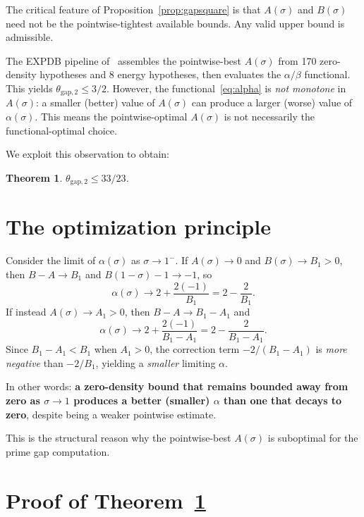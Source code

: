 \documentclass[11pt,a4paper]{amsart}
\theoremstyle{plain}
\newtheorem{theorem}{Theorem}
\theoremstyle{definition}
\begin{document}
The critical feature of Proposition~\ref{prop:gapsquare} is that $A(\sigma)$ and $B(\sigma)$ need not be the pointwise-tightest available bounds. Any valid upper bound is admissible.

The EXPDB pipeline of~\cite{TTY25} assembles the pointwise-best $A(\sigma)$ from 170 zero-density hypotheses and 8 energy hypotheses, then evaluates the $\alpha/\beta$ functional. This yields $\theta_{\mathrm{gap},2} \leq 3/2$. However, the functional~\eqref{eq:alpha} is \emph{not monotone} in $A(\sigma)$: a smaller (better) value of $A(\sigma)$ can produce a larger (worse) value of $\alpha(\sigma)$. This means the pointwise-optimal $A(\sigma)$ is not necessarily the functional-optimal choice.

We exploit this observation to obtain:

\begin{theorem}\label{thm:main}
$\theta_{\mathrm{gap},2} \leq 33/23$.
\end{theorem}

\section{The optimization principle}

Consider the limit of $\alpha(\sigma)$ as $\sigma \to 1^-$. If $A(\sigma) \to 0$ and $B(\sigma) \to B_1 > 0$, then $B - A \to B_1$ and $B(1-\sigma) - 1 \to -1$, so
\[
\alpha(\sigma) \to 2 + \frac{2(-1)}{B_1} = 2 - \frac{2}{B_1}.
\]
If instead $A(\sigma) \to A_1 > 0$, then $B - A \to B_1 - A_1$ and
\[
\alpha(\sigma) \to 2 + \frac{2(-1)}{B_1 - A_1} = 2 - \frac{2}{B_1 - A_1}.
\]
Since $B_1 - A_1 < B_1$ when $A_1 > 0$, the correction term $-2/(B_1 - A_1)$ is \emph{more negative} than $-2/B_1$, yielding a \emph{smaller} limiting $\alpha$.

In other words: \textbf{a zero-density bound that remains bounded away from zero as $\sigma \to 1$ produces a better (smaller) $\alpha$ than one that decays to zero}, despite being a weaker pointwise estimate.

This is the structural reason why the pointwise-best $A(\sigma)$ is suboptimal for the prime gap computation.

\section{Proof of Theorem~\ref{thm:main}}
\end{document}
